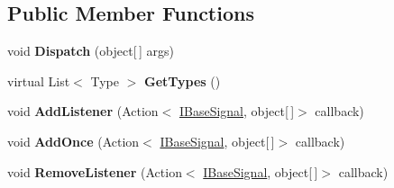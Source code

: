 \subsection*{Public Member Functions}
\begin{DoxyCompactItemize}
\item 
\hypertarget{classstrange_1_1extensions_1_1signal_1_1impl_1_1_base_signal_a707a909487eb860b0d8fd99e22fd1b4a}{void {\bfseries Dispatch} (object\mbox{[}$\,$\mbox{]} args)}\label{classstrange_1_1extensions_1_1signal_1_1impl_1_1_base_signal_a707a909487eb860b0d8fd99e22fd1b4a}

\item 
\hypertarget{classstrange_1_1extensions_1_1signal_1_1impl_1_1_base_signal_ac3e71958027c85ea755eca2f27f6e882}{virtual List$<$ Type $>$ {\bfseries Get\-Types} ()}\label{classstrange_1_1extensions_1_1signal_1_1impl_1_1_base_signal_ac3e71958027c85ea755eca2f27f6e882}

\item 
\hypertarget{classstrange_1_1extensions_1_1signal_1_1impl_1_1_base_signal_ad1dbeeb42ccc56063134cfa7433dbd77}{void {\bfseries Add\-Listener} (Action$<$ \hyperlink{interfacestrange_1_1extensions_1_1signal_1_1api_1_1_i_base_signal}{I\-Base\-Signal}, object\mbox{[}$\,$\mbox{]}$>$ callback)}\label{classstrange_1_1extensions_1_1signal_1_1impl_1_1_base_signal_ad1dbeeb42ccc56063134cfa7433dbd77}

\item 
\hypertarget{classstrange_1_1extensions_1_1signal_1_1impl_1_1_base_signal_ae01bb5fd2b4cc969f1561e98ee999fb4}{void {\bfseries Add\-Once} (Action$<$ \hyperlink{interfacestrange_1_1extensions_1_1signal_1_1api_1_1_i_base_signal}{I\-Base\-Signal}, object\mbox{[}$\,$\mbox{]}$>$ callback)}\label{classstrange_1_1extensions_1_1signal_1_1impl_1_1_base_signal_ae01bb5fd2b4cc969f1561e98ee999fb4}

\item 
\hypertarget{classstrange_1_1extensions_1_1signal_1_1impl_1_1_base_signal_a238704e0facdc151665586d637400733}{void {\bfseries Remove\-Listener} (Action$<$ \hyperlink{interfacestrange_1_1extensions_1_1signal_1_1api_1_1_i_base_signal}{I\-Base\-Signal}, object\mbox{[}$\,$\mbox{]}$>$ callback)}\label{classstrange_1_1extensions_1_1signal_1_1impl_1_1_base_signal_a238704e0facdc151665586d637400733}

\end{DoxyCompactItemize}
